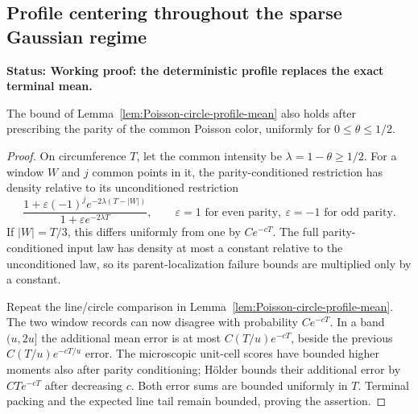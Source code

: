 \documentclass[11pt,letterpaper]{article}
\newcommand{\status}[1]{\textbf{Status: #1.}}
\begin{document}
\subsection{Profile centering throughout the sparse Gaussian regime}
\label{sec:all-sparse-profile-centering}

\status{Working proof: the deterministic profile replaces the exact terminal mean}

\begin{lemma}
\label{lem:parity-Poisson-profile-mean}
The bound of Lemma~\ref{lem:Poisson-circle-profile-mean}
also holds after prescribing the parity of the common
Poisson color, uniformly for $0\le\theta\le1/2$.
\end{lemma}
\begin{proof}
On circumference $T$, let the common intensity be
$\lambda=1-\theta\ge1/2$.
For a window $W$ and $j$ common points in it, the
parity-conditioned restriction has density relative to
its unconditioned restriction
\[
 \frac{1+\varepsilon(-1)^j e^{-2\lambda(T-|W|)}}
      {1+\varepsilon e^{-2\lambda T}},
 \qquad \varepsilon=1\text{ for even parity},\
        \varepsilon=-1\text{ for odd parity}.
\]
If $|W|=T/3$, this differs uniformly from one by
$Ce^{-cT}$. The full parity-conditioned input law has
density at most a constant relative to the unconditioned
law, so its parent-localization failure bounds are
multiplied only by a constant.

Repeat the line/circle comparison in
Lemma~\ref{lem:Poisson-circle-profile-mean}.
The two window records can now disagree with probability
$Ce^{-cT}$. In a band $(u,2u]$ the additional mean error
is at most $C(T/u)e^{-cT}$, beside the previous
$C(T/u)e^{-cT/u}$ error.
The microscopic unit-cell scores have bounded higher
moments also after parity conditioning; H\"older bounds
their additional error by $CTe^{-cT}$ after decreasing $c$.
Both error sums are bounded uniformly in $T$.
Terminal packing and the expected line tail remain bounded,
proving the assertion.
\end{proof}
\end{document}
